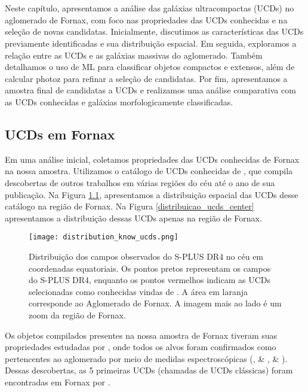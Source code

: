 \chapter{\chapternameanalysis}\label{cap:analise}
Neste capítulo, apresentamos a análise das galáxias ultracompactas (UCDs) no aglomerado de Fornax, com foco nas propriedades das UCDs conhecidas e na seleção de novas candidatas. Inicialmente, discutimos as características das UCDs previamente identificadas e sua distribuição espacial. Em seguida, exploramos a relação entre as UCDs e as galáxias massivas do aglomerado. Também detalhamos o uso de \ac{ML} para classificar objetos compactos e extensos, além de calcular \ac{photoz} para refinar a seleção de candidatas. Por fim, apresentamos a amostra final de candidatas a UCDs e realizamos uma análise comparativa com as UCDs conhecidas e galáxias morfologicamente classificadas.

\section{UCDs em Fornax}\label{sec:ucds_fornax}
Em uma análise inicial, coletamos propriedades das UCDs conhecidas de Fornax na nossa amostra. Utilizamos o catálogo de UCDs conhecidas de \cite{catalog_ucds}, que compila descobertas de outros trabalhos em várias regiões do céu até o ano de sua publicação. Na Figura \ref{distribution_know_ucds}, apresentamos a distribuição espacial das UCDs desse catálogo na região de Fornax. Na Figura \ref{distribuicao_ucds_center} apresentamos a distribuição dessas UCDs apenas na região de Fornax.

\begin{figure}[!ht]
    \centering
    \texttt{[image: distribution\_know\_ucds.png]}
    \caption[]{Distribuição dos campos observados do S-PLUS DR4 no céu em coordenadas equatoriais. Os pontos pretos representam os campos do S-PLUS DR4, enquanto os pontos vermelhos indicam as UCDs selecionadas como conhecidas vindas de \cite{catalog_ucds}. A área em laranja corresponde ao Aglomerado de Fornax. A imagem mais ao lado é um zoom da região de Fornax.}
    \label{distribution_know_ucds}
\end{figure}

Os objetos compilados presentes na nossa amostra de Fornax tiveram suas propriedades estudadas por \cite{Mieske_2008_2}, onde todos os alvos foram confirmados como pertencentes ao aglomerado por meio de medidas espectroscópicas (\citealt{Drinkwater_2000}, \citealt{Mieske_2002} \& \citeyear{Mieske_2004}, \citealt{Richtler_2004} \& \citeyear{Richtler_2008}). Dessas descobertas, as 5 primeiras UCDs (chamadas de UCDs clássicas) foram encontradas em Fornax por \cite{Drinkwater_2000}.

